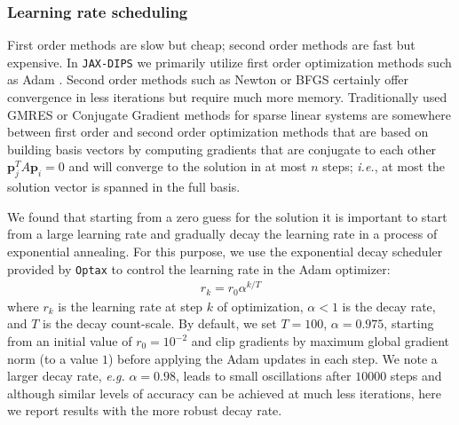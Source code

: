 \documentclass{elsarticle}
\begin{document}
\subsubsection{Learning rate scheduling}
First order methods are slow but cheap; second order methods are fast but expensive. In \texttt{JAX-DIPS} we primarily utilize first order optimization methods such as Adam \cite{kingma2014adam}. Second order methods such as Newton or BFGS certainly offer convergence in less iterations but require much more memory. Traditionally used GMRES or Conjugate Gradient methods for sparse linear systems are somewhere between first order and second order optimization methods that are based on building basis vectors by computing gradients that are conjugate to each other $\mathbf{p}_j^T A \mathbf{p}_i=0$ and will converge to the solution in at most $n$ steps; \textit{i.e.}, at most the solution vector is spanned in the full basis.



We found that starting from a zero guess for the solution it is important to start from a large learning rate and gradually decay the learning rate in a process of exponential annealing. For this purpose, we use the exponential decay scheduler provided by \texttt{Optax} \cite{optax2020github} to control the learning rate in the Adam optimizer:
\begin{align*}
r_{k} = r_0 \alpha^{k / T}
\end{align*}
where $r_k$ is the learning rate at step $k$ of optimization, $\alpha<1$ is the decay rate, and $T$ is the decay count-scale. By default, we set $T=100$, $\alpha=0.975$, starting from an initial value of $r_0=10^{-2}$ and clip gradients by maximum global gradient norm (to a value $1$) \cite{gradClipping} before applying the Adam updates in each step. We note a larger decay rate, \textit{e.g.} $\alpha=0.98$, leads to small oscillations after $10000$ steps and although similar levels of accuracy can be achieved at much less iterations, here we report results with the more robust decay rate. %

\end{document}
